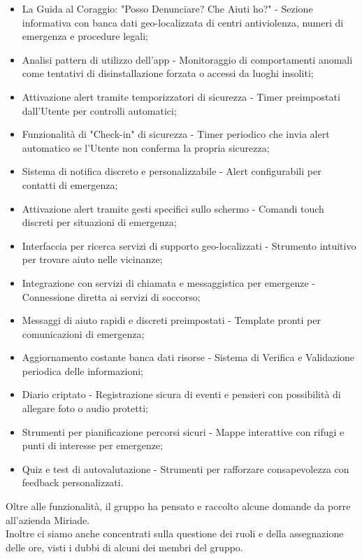 \documentclass[a4paper,12pt]{article}
\newcommand{\ignoreglossary}{}
\begin{document}
\begin{itemize}
    \item La Guida al Coraggio: "Posso Denunciare? Che Aiuti ho?" - Sezione informativa con banca dati geo-localizzata di centri antiviolenza, numeri di emergenza e procedure legali;
    \item Analisi pattern di utilizzo dell'app - Monitoraggio di comportamenti anomali come tentativi di disinstallazione forzata o accessi da luoghi insoliti;
    \item Attivazione alert tramite temporizzatori di sicurezza - Timer preimpostati dall'Utente per controlli automatici;
    \item Funzionalità di "Check-in" di sicurezza - Timer periodico che invia alert automatico se l'Utente non conferma la propria sicurezza;
    \item Sistema di notifica discreto e personalizzabile - Alert configurabili per contatti di emergenza;
    \item Attivazione alert tramite gesti specifici sullo schermo - Comandi touch discreti per situazioni di emergenza;
    \item Interfaccia per ricerca servizi di supporto geo-localizzati - Strumento intuitivo per trovare aiuto nelle vicinanze;
    \item Integrazione con servizi di chiamata e messaggistica per emergenze - Connessione diretta ai servizi di soccorso;
    \item Messaggi di aiuto rapidi e discreti preimpostati - Template pronti per comunicazioni di emergenza;
    \item Aggiornamento costante banca dati risorse - Sistema di Verifica e Validazione periodica delle informazioni;
    \item Diario criptato - Registrazione sicura di eventi e pensieri con possibilità di allegare foto o audio protetti;
    \item Strumenti per pianificazione percorsi sicuri - Mappe interattive con rifugi e punti di interesse per emergenze;
    \item Quiz e test di autovalutazione - Strumenti per rafforzare consapevolezza con feedback personalizzati.
\end{itemize}
Oltre alle funzionalità, il gruppo ha pensato e raccolto alcune domande da porre all'azienda Miriade.\\
Inoltre \ignoreglossary{ci} siamo anche concentrati sulla questione dei ruoli e della assegnazione delle ore, visti i dubbi di alcuni dei membri del gruppo.
\end{document}
